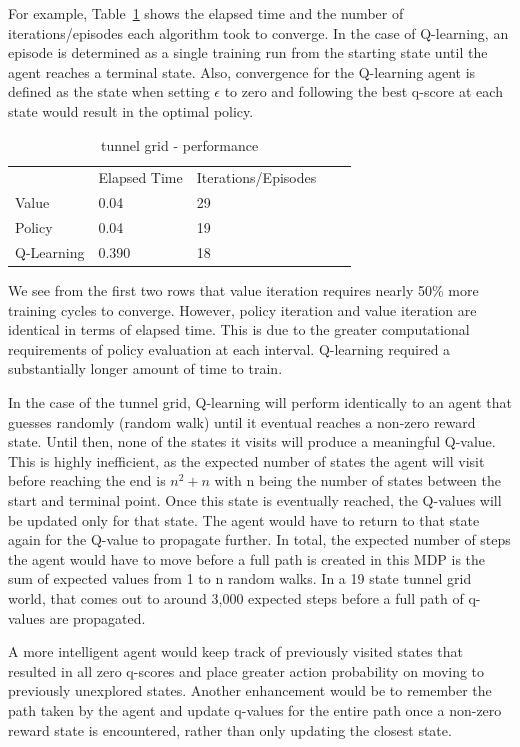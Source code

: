 \documentclass{sig-alternate}
\begin{document}
For example, Table~\ref{tunnel-performance} shows the elapsed time and the number of iterations/episodes each algorithm took to converge. In the case of Q-learning, an episode is determined as a single training run from the starting state until the agent reaches a terminal state. Also, convergence for the Q-learning agent is defined as the state when setting $\epsilon$ to zero and following the best q-score at each state would result in the optimal policy.


\begin{table}[!htbp]
\begin{tabular}{lllll}
           & Elapsed Time & Iterations/Episodes &  &  \\
Value      & 0.04         & 29                  &  &  \\
Policy     & 0.04         & 19                  &  &  \\
Q-Learning & 0.390        & 18                  &  & 
\end{tabular}
\caption{tunnel grid - performance\label{tunnel-performance}}
\end{table}

We see from the first two rows that value iteration requires nearly 50\% more training cycles to converge. However, policy iteration and value iteration are identical in terms of elapsed time. This is due to the greater computational requirements of policy evaluation at each interval. Q-learning required a substantially longer amount of time to train.

In the case of the tunnel grid, Q-learning will perform identically to an agent that guesses randomly (random walk) until it eventual reaches a non-zero reward state. Until then, none of the states it visits will produce a meaningful Q-value. This is highly inefficient, as the expected number of states the agent will visit before reaching the end is $n^2 + n$ with n being the number of states between the start and terminal point. Once this state is eventually reached, the Q-values will be updated only for that state. The agent would have to return to that state again for the Q-value to propagate further. In total, the expected number of steps the agent would have to move before a full path is created in this MDP is the sum of expected values from 1 to n random walks. In a 19 state tunnel grid world, that comes out to around 3,000 expected steps before a full path of q-values are propagated.

A more intelligent agent would keep track of previously visited states that resulted in all zero q-scores and place greater action probability on moving to previously unexplored states. Another enhancement would be to remember the path taken by the agent and update q-values for the entire path once a non-zero reward state is encountered, rather than only updating the closest state.
\end{document}
